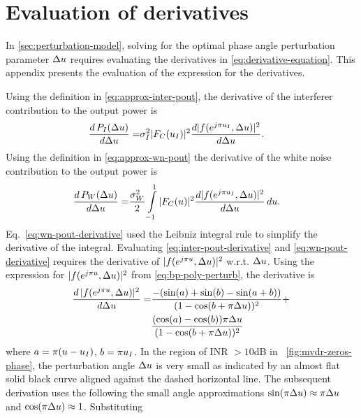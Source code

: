 
\chapter{Evaluation of derivatives}
\label{app:apdx-derivation}
In \sect{}\ref{sec:perturbation-model}, solving for the optimal phase angle perturbation parameter $\Delta u$ requires evaluating the derivatives in \eqref{eq:derivative-equation}. This appendix presents the evaluation of the expression for the derivatives.

Using the definition in \eqref{eq:approx-inter-pout}, the derivative of the interferer contribution to the output power is 
\begin{align} 
 \label{eq:inter-pout-derivative}
 \frac{d\,P_I(\Delta u)}{d\Delta u} =& \sigma_I^2|F_C(u_I)|^2 \frac{d |f(e^{j\pi u_I}, \Delta u)|^2}{d\Delta u}.
\end{align}
Using the definition in \eqref{eq:approx-wn-pout} the derivative of the white noise contribution to the output power is
\begin{align}
\label{eq:wn-pout-derivative}
\frac{d\,P_W(\Delta u)}{d\Delta u} =& \frac{\sigma^2_W}{2}\int\limits_{-1}^{1} |F_C(u)|^2 \frac{d|f(e^{j\pi u_I}, \Delta u) |^2}{d\Delta u}\,du.
\end{align}
Eq.~\eqref{eq:wn-pout-derivative} used the Leibniz integral rule to simplify the derivative of the integral. 
Evaluating \eqref{eq:inter-pout-derivative} and \eqref{eq:wn-pout-derivative} requires the derivative of $|f(e^{j\pi u}, \Delta u)|^2$ w.r.t.  $\Delta u$. Using the expression for $|f(e^{j\pi u}, \Delta u)|^2$ from \eqref{eq:bp-poly-perturb}, the derivative is
\begin{align} 
\label{eq:funczero-derivative}
\frac{d\, |f(e^{j\pi u}, \Delta u)|^2}{d\Delta u} =& \frac{-(\sin(a) + \sin(b) - \sin(a+b))}{(1 - \cos(b + \pi\Delta u))^2} + \nonumber \\
& \frac{(\cos(a) - \cos(b))\pi\Delta u}{(1 - \cos(b + \pi\Delta u))^2} 
\end{align}
where $a = \pi(u - u_I)$, $b = \pi u_I$. In the region of INR
$>10$dB in \figurename{}~\ref{fig:mvdr-zeros-phase}, the perturbation
angle $\Delta u$ is very small as indicated by an almost flat solid
black curve aligned against the dashed horizontal line. The subsequent
derivation uses the following the small angle approximations
$\sin(\pi\Delta u) \approx \pi\Delta u$ and
$\cos(\pi\Delta u) \approx 1$. Substituting
